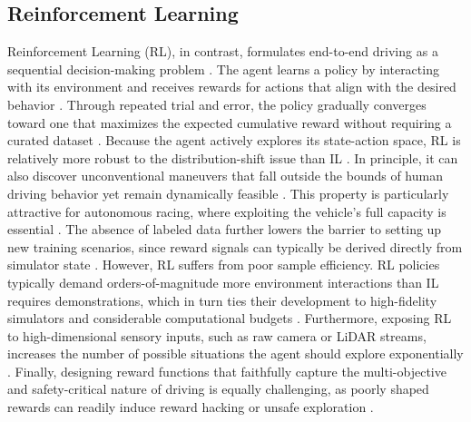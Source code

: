 \subsection{Reinforcement Learning}
\label{subsection:ReinforcementLearning}
Reinforcement Learning (RL), in contrast, formulates end-to-end driving as a sequential decision-making problem \cite{wang_VersatileEfficientReinforcement_2022, chib_recent_2023, hu_review_2026, kendall_LearningDriveDay_2019}.
The agent learns a policy by interacting with its environment and receives rewards for actions that align with the desired behavior \cite{wang_VersatileEfficientReinforcement_2022, chib_recent_2023}.
Through repeated trial and error, the policy gradually converges toward one that maximizes the expected cumulative reward without requiring a curated dataset \cite{wang_VersatileEfficientReinforcement_2022, chib_recent_2023}.
Because the agent actively explores its state-action space, RL is relatively more robust to the distribution-shift issue than IL \cite{chib_recent_2023, wang_VersatileEfficientReinforcement_2022, haarnoja_SoftActorCritic_2018}.
In principle, it can also discover unconventional maneuvers that fall outside the bounds of human driving behavior yet remain dynamically feasible \cite{chib_recent_2023, wang_VersatileEfficientReinforcement_2022}.
This property is particularly attractive for autonomous racing, where exploiting the vehicle's full capacity is essential \cite{ogretmen_local_2025}.
The absence of labeled data further lowers the barrier to setting up new training scenarios, since reward signals can typically be derived directly from simulator state \cite{wang_VersatileEfficientReinforcement_2022}.
However, RL suffers from poor sample efficiency.
RL policies typically demand orders-of-magnitude more environment interactions than IL requires demonstrations, which in turn ties their development to high-fidelity simulators and considerable computational budgets \cite{wang_VersatileEfficientReinforcement_2022, hu_review_2026}.
Furthermore, exposing RL to high-dimensional sensory inputs, such as raw camera or LiDAR streams, increases the number of possible situations the agent should explore exponentially \cite{wang_VersatileEfficientReinforcement_2022,hu_review_2026,tampuu_SurveyEndtoEndDriving_2022}.
Finally, designing reward functions that faithfully capture the multi-objective and safety-critical nature of driving is equally challenging, as poorly shaped rewards can readily induce reward hacking or unsafe exploration \cite{wang_VersatileEfficientReinforcement_2022, chib_recent_2023}.

